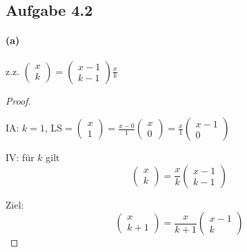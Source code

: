 \newpage

\subsection{Aufgabe 4.2}

\paragraph{(a)}
z.z. $\begin{pmatrix}
x\\
k
\end{pmatrix}
=
\begin{pmatrix}
x-1\\
k-1
\end{pmatrix}\frac{x}{k}$
\begin{proof}
$ $\newline

IA: $k=1$, LS$=
\begin{pmatrix}
x\\
1
\end{pmatrix}
=\frac{x-0}{1}
\begin{pmatrix}
x\\
0
\end{pmatrix}
=\frac{x}{1}
\begin{pmatrix}
x-1\\
0
\end{pmatrix}$

IV: für $k$ gilt
\begin{equation*}
\begin{pmatrix}
x\\
k
\end{pmatrix}
=\frac{x}{k}
\begin{pmatrix}
x-1\\
k-1
\end{pmatrix}
\end{equation*}

Ziel:
\begin{equation*}
\begin{pmatrix}
x\\
k+1
\end{pmatrix}
=\frac{x}{k+1}
\begin{pmatrix}
x-1\\
k
\end{pmatrix}
\end{equation*}


\end{proof}
